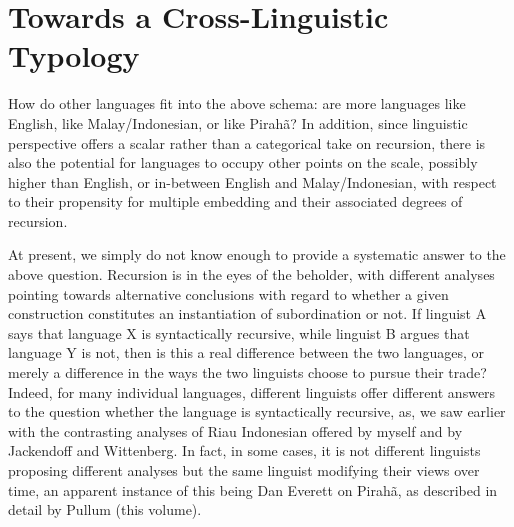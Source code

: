 \documentclass[output=paper,colorlinks,citecolor=brown
]{langscibook}
\begin{document}
\section{Towards a Cross-Linguistic Typology}

How do other languages fit into the above schema: are more languages like English, like Malay/Indonesian, or like Pirahã?  In addition, since linguistic perspective offers a scalar rather than a categorical take on recursion, there is also the potential for languages to occupy other points on the scale, possibly higher than English, or in-between English and Malay/Indonesian, with respect to their propensity for multiple embedding and their associated degrees of recursion.

At present, we simply do not know enough to provide a systematic answer to the above question.  Recursion is in the eyes of the beholder, with different analyses pointing towards alternative conclusions with regard to whether a given construction constitutes an instantiation of subordination or not.  If linguist A says that language X is syntactically recursive, while linguist B argues that language Y is not, then is this a real difference between the two languages, or merely a difference in the ways the two linguists choose to pursue their trade?  Indeed, for many individual languages, different linguists offer different answers to the question whether the language is syntactically recursive, as, we saw earlier with the contrasting analyses of Riau Indonesian offered by myself and by Jackendoff and Wittenberg. In fact, in some cases, it is not different linguists proposing different analyses but the same linguist modifying their views over time, an apparent instance of this being Dan Everett on Pirahã, as described in detail by Pullum (this volume).
\end{document}

